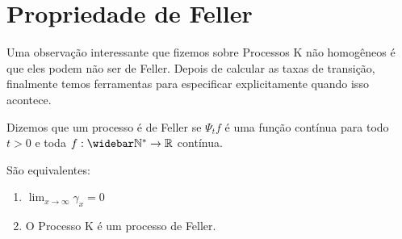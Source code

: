 
\section{Propriedade de Feller}
\label{sec:prop-feller}


Uma observação interessante que fizemos sobre Processos K não
homogêneos é que eles podem não ser de Feller.  Depois de calcular as
taxas de transição, finalmente temos ferramentas para especificar
explicitamente quando isso acontece.

Dizemos que um processo é de Feller se $\Psi_t f$ é uma função contínua
para todo $t > 0$ e toda $f: \Nzb \to \R$ contínua.

\begin{proposicao}
  São equivalentes:
  \begin{enumerate}
  \item $\displaystyle \lim_{x \to \infty} \gamma_x = 0$
  \item O Processo K é um processo de Feller.
  \end{enumerate}
\end{proposicao}

